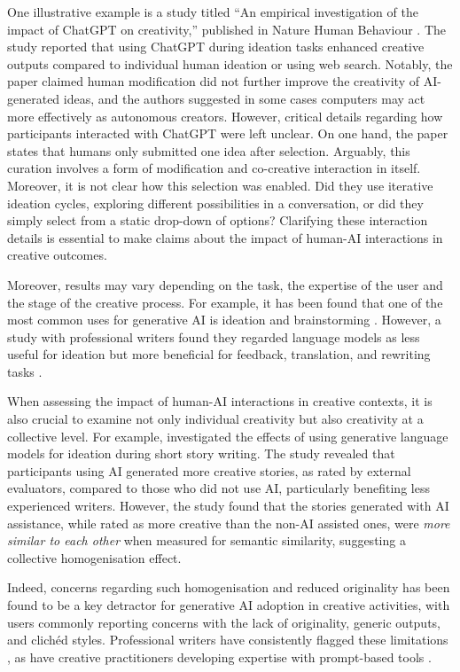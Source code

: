 One illustrative example is a study titled ``An empirical investigation of the impact of ChatGPT on creativity,'' published in Nature Human Behaviour \citep{Lee2024-vz}. The study reported that using ChatGPT during ideation tasks enhanced creative outputs compared to individual human ideation or using web search. Notably, the paper claimed human modification did not further improve the creativity of AI-generated ideas, and the authors suggested in some cases computers may act more effectively as autonomous creators. However, critical details regarding how participants interacted with ChatGPT were left unclear. On one hand, the paper states that humans only submitted one idea after selection. Arguably, this curation involves a form of modification and co-creative interaction in itself. Moreover, it is not clear how this selection was enabled. Did they use iterative ideation cycles, exploring different possibilities in a conversation, or did they simply select from a static drop-down of options? Clarifying these interaction details is essential to make claims about the impact of human-AI interactions in creative outcomes.

Moreover, results may vary depending on the task, the expertise of the user and the stage of the creative process. For example, it has been found that one of the most common uses for generative AI is ideation and brainstorming \citep{Zao-Sanders2024-qo}. However, a study with professional writers found they regarded language models as less useful for ideation but more beneficial for feedback, translation, and rewriting tasks \citep{Chakrabarty2024-ov}.

When assessing the impact of human-AI interactions in creative contexts, it is also crucial to examine not only individual creativity but also creativity at a collective level. For example, \citet{Doshi2023-dv} investigated the effects of using generative language models for ideation during short story writing. The study revealed that participants using AI generated more creative stories, as rated by external evaluators, compared to those who did not use AI, particularly benefiting less experienced writers. However, the study found that the stories generated with AI assistance, while rated as more creative than the non-AI assisted ones, were \textit{more similar to each other} when measured for semantic similarity, suggesting a collective homogenisation effect.

Indeed, concerns regarding such homogenisation and reduced originality has been found to be a key detractor for generative AI adoption in creative activities, with users commonly reporting concerns with the lack of originality, generic outputs, and clichéd styles. Professional writers have consistently flagged these limitations \citep{Chakrabarty2024-ov, Ippolito2022-mf}, as have creative practitioners developing expertise with prompt-based tools \citep{Chang2023-tv, Li2024-yh}.

